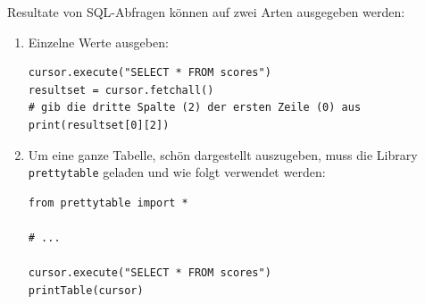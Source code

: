 \begin{myexample}
    Resultate von SQL-Abfragen können auf zwei Arten ausgegeben werden:
    \begin{enumerate}
        \item Einzelne Werte ausgeben:
              \begin{lstlisting}
cursor.execute("SELECT * FROM scores")
resultset = cursor.fetchall()
# gib die dritte Spalte (2) der ersten Zeile (0) aus
print(resultset[0][2])
\end{lstlisting}

        \item Um eine ganze Tabelle, schön dargestellt auszugeben, muss die Library \lstinline|prettytable| geladen und wie folgt verwendet werden:
              \begin{lstlisting}
from prettytable import *

# ...

cursor.execute("SELECT * FROM scores")
printTable(cursor)
\end{lstlisting}
    \end{enumerate}
\end{myexample}

